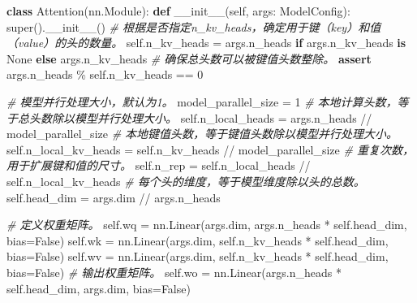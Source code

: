 \documentclass[
]{article}
\newenvironment{Shaded}{}{}
\newcommand{\BuiltInTok}[1]{\textcolor[rgb]{0.00,0.50,0.00}{#1}}
\newcommand{\CommentTok}[1]{\textcolor[rgb]{0.38,0.63,0.69}{\textit{#1}}}
\newcommand{\ControlFlowTok}[1]{\textcolor[rgb]{0.00,0.44,0.13}{\textbf{#1}}}
\newcommand{\DecValTok}[1]{\textcolor[rgb]{0.25,0.63,0.44}{#1}}
\newcommand{\FunctionTok}[1]{\textcolor[rgb]{0.02,0.16,0.49}{#1}}
\newcommand{\KeywordTok}[1]{\textcolor[rgb]{0.00,0.44,0.13}{\textbf{#1}}}
\newcommand{\NormalTok}[1]{#1}
\newcommand{\OperatorTok}[1]{\textcolor[rgb]{0.40,0.40,0.40}{#1}}
\newcommand{\VariableTok}[1]{\textcolor[rgb]{0.10,0.09,0.49}{#1}}
\begin{document}
\begin{Shaded}
\begin{Highlighting}[]
\KeywordTok{class}\NormalTok{ Attention(nn.Module):}
    \KeywordTok{def} \FunctionTok{\_\_init\_\_}\NormalTok{(}\VariableTok{self}\NormalTok{, args: ModelConfig):}
        \BuiltInTok{super}\NormalTok{().}\FunctionTok{\_\_init\_\_}\NormalTok{()}
        \CommentTok{\# 根据是否指定n\_kv\_heads，确定用于键（key）和值（value）的头的数量。}
        \VariableTok{self}\NormalTok{.n\_kv\_heads }\OperatorTok{=}\NormalTok{ args.n\_heads }\ControlFlowTok{if}\NormalTok{ args.n\_kv\_heads }\KeywordTok{is} \VariableTok{None} \ControlFlowTok{else}\NormalTok{ args.n\_kv\_heads}
        \CommentTok{\# 确保总头数可以被键值头数整除。}
        \ControlFlowTok{assert}\NormalTok{ args.n\_heads }\OperatorTok{\%} \VariableTok{self}\NormalTok{.n\_kv\_heads }\OperatorTok{==} \DecValTok{0}

        \CommentTok{\# 模型并行处理大小，默认为1。}
\NormalTok{        model\_parallel\_size }\OperatorTok{=} \DecValTok{1}
        \CommentTok{\# 本地计算头数，等于总头数除以模型并行处理大小。}
        \VariableTok{self}\NormalTok{.n\_local\_heads }\OperatorTok{=}\NormalTok{ args.n\_heads }\OperatorTok{//}\NormalTok{ model\_parallel\_size}
        \CommentTok{\# 本地键值头数，等于键值头数除以模型并行处理大小。}
        \VariableTok{self}\NormalTok{.n\_local\_kv\_heads }\OperatorTok{=} \VariableTok{self}\NormalTok{.n\_kv\_heads }\OperatorTok{//}\NormalTok{ model\_parallel\_size}
        \CommentTok{\# 重复次数，用于扩展键和值的尺寸。}
        \VariableTok{self}\NormalTok{.n\_rep }\OperatorTok{=} \VariableTok{self}\NormalTok{.n\_local\_heads }\OperatorTok{//} \VariableTok{self}\NormalTok{.n\_local\_kv\_heads}
        \CommentTok{\# 每个头的维度，等于模型维度除以头的总数。}
        \VariableTok{self}\NormalTok{.head\_dim }\OperatorTok{=}\NormalTok{ args.dim }\OperatorTok{//}\NormalTok{ args.n\_heads}

        \CommentTok{\# 定义权重矩阵。}
        \VariableTok{self}\NormalTok{.wq }\OperatorTok{=}\NormalTok{ nn.Linear(args.dim, args.n\_heads }\OperatorTok{*} \VariableTok{self}\NormalTok{.head\_dim, bias}\OperatorTok{=}\VariableTok{False}\NormalTok{)}
        \VariableTok{self}\NormalTok{.wk }\OperatorTok{=}\NormalTok{ nn.Linear(args.dim, }\VariableTok{self}\NormalTok{.n\_kv\_heads }\OperatorTok{*} \VariableTok{self}\NormalTok{.head\_dim, bias}\OperatorTok{=}\VariableTok{False}\NormalTok{)}
        \VariableTok{self}\NormalTok{.wv }\OperatorTok{=}\NormalTok{ nn.Linear(args.dim, }\VariableTok{self}\NormalTok{.n\_kv\_heads }\OperatorTok{*} \VariableTok{self}\NormalTok{.head\_dim, bias}\OperatorTok{=}\VariableTok{False}\NormalTok{)}
        \CommentTok{\# 输出权重矩阵。}
        \VariableTok{self}\NormalTok{.wo }\OperatorTok{=}\NormalTok{ nn.Linear(args.n\_heads }\OperatorTok{*} \VariableTok{self}\NormalTok{.head\_dim, args.dim, bias}\OperatorTok{=}\VariableTok{False}\NormalTok{)}


\end{Highlighting}
\end{Shaded}
\end{document}

